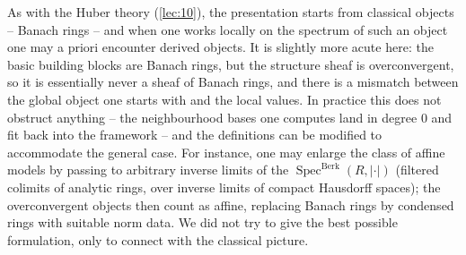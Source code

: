 \begin{remark}
\label{rmk:23:derived-subtlety}
As with the Huber theory (\cref{lec:10}), the presentation starts from classical
objects -- Banach rings -- and when one works locally on the spectrum of such
an object one may a priori encounter derived objects. It is slightly more acute
here: the basic building blocks are Banach rings, but the structure sheaf is
overconvergent, so it is essentially never a sheaf of Banach rings, and there is
a mismatch between the global object one starts with and the local values. In
practice this does not obstruct anything -- the neighbourhood bases one computes
land in degree $0$ and fit back into the framework -- and the definitions can be
modified to accommodate the general case. For instance, one may enlarge the class
of affine models by passing to arbitrary inverse limits of the
$\operatorname{Spec}^{\mathrm{Berk}}(R,\lvert\cdot\rvert)$ (filtered colimits of
analytic rings, over inverse limits of compact Hausdorff spaces); the
overconvergent objects then count as affine, replacing Banach rings by condensed
rings with suitable norm data. We did not try to give the best possible
formulation, only to connect with the classical picture.
\end{remark}

